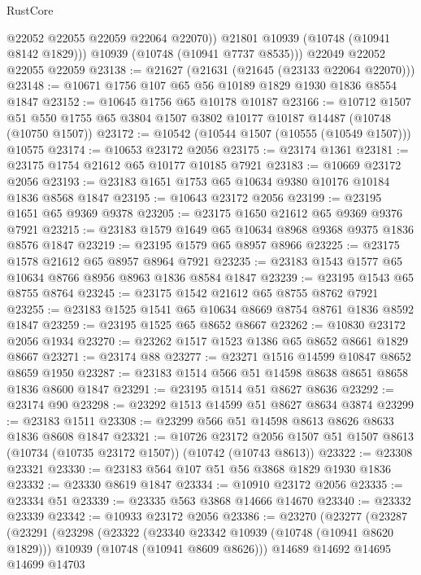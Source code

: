 \begin{lexlean}{RustCore}
\begin{coremodule}
            @22052
            @22055
            @22059
            @22064
            @22070))
        @21801
        @10939
        (@10748 (@10941 @8142 @1829)))
      @10939
      (@10748 (@10941 @7737 @8535)))
    @22049
    @22052
    @22055
    @22059
@23138 := @21627 (@21631 (@21645 (@23133 @22064 @22070)))
@23148 := @10671 @1756 @107 @65 @56 @10189 @1829 @1930 @1836 @8554 @1847
@23152 := @10645 @1756 @65 @10178 @10187
@23166 := @10712
    @1507
    @51
    @550
    @1755
    @65
    @3804
    @1507
    @3802
    @10177
    @10187
    @14487
    (@10748 (@10750 @1507))
@23172 := @10542 (@10544 @1507 (@10555 (@10549 @1507))) @10575
@23174 := @10653 @23172 @2056
@23175 := @23174 @1361
@23181 := @23175 @1754 @21612 @65 @10177 @10185 @7921
@23183 := @10669 @23172 @2056
@23193 := @23183 @1651 @1753 @65 @10634 @9380 @10176 @10184 @1836 @8568 @1847
@23195 := @10643 @23172 @2056
@23199 := @23195 @1651 @65 @9369 @9378
@23205 := @23175 @1650 @21612 @65 @9369 @9376 @7921
@23215 := @23183 @1579 @1649 @65 @10634 @8968 @9368 @9375 @1836 @8576 @1847
@23219 := @23195 @1579 @65 @8957 @8966
@23225 := @23175 @1578 @21612 @65 @8957 @8964 @7921
@23235 := @23183 @1543 @1577 @65 @10634 @8766 @8956 @8963 @1836 @8584 @1847
@23239 := @23195 @1543 @65 @8755 @8764
@23245 := @23175 @1542 @21612 @65 @8755 @8762 @7921
@23255 := @23183 @1525 @1541 @65 @10634 @8669 @8754 @8761 @1836 @8592 @1847
@23259 := @23195 @1525 @65 @8652 @8667
@23262 := @10830 @23172 @2056 @1934
@23270 := @23262 @1517 @1523 @1386 @65 @8652 @8661 @1829 @8667
@23271 := @23174 @88
@23277 := @23271 @1516 @14599 @10847 @8652 @8659 @1950
@23287 := @23183 @1514 @566 @51 @14598 @8638 @8651 @8658 @1836 @8600 @1847
@23291 := @23195 @1514 @51 @8627 @8636
@23292 := @23174 @90
@23298 := @23292 @1513 @14599 @51 @8627 @8634 @3874
@23299 := @23183 @1511
@23308 := @23299 @566 @51 @14598 @8613 @8626 @8633 @1836 @8608 @1847
@23321 := @10726
    @23172
    @2056
    @1507
    @51
    @1507
    @8613
    (@10734 (@10735 @23172 @1507))
    (@10742 (@10743 @8613))
@23322 := @23308 @23321
@23330 := @23183 @564 @107 @51 @56 @3868 @1829 @1930 @1836
@23332 := @23330 @8619 @1847
@23334 := @10910 @23172 @2056
@23335 := @23334 @51
@23339 := @23335 @563 @3868 @14666 @14670
@23340 := @23332 @23339
@23342 := @10933 @23172 @2056
@23386 := @23270
    (@23277
      (@23287
        (@23291
          (@23298
            (@23322
              (@23340 @23342 @10939 (@10748 (@10941 @8620 @1829)))
              @10939
              (@10748 (@10941 @8609 @8626)))
            @14689
            @14692
            @14695
            @14699
            @14703

\end{coremodule}
\end{lexlean}
